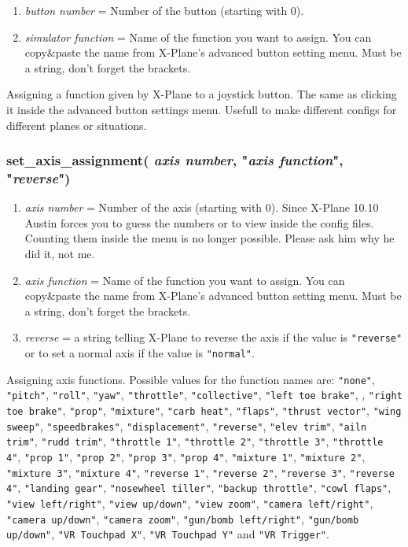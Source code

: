\documentclass[11pt,parskip=half,a4paper]{scrartcl}
\begin{document}
\begin{enumerate}
	\item \emph{button number} = Number of the button (starting with 0).
	\item \emph{simulator function} = Name of the function you want to assign. You can copy\&paste the name from X-Plane's advanced button setting menu. Must be a string, don't forget the brackets.
\end{enumerate}

Assigning a function given by X-Plane to a joystick button. The same as clicking it inside the advanced button settings menu. Usefull to make different configs for different planes or situations.

\newpage
\subsubsection{set\_axis\_assignment( \emph{axis number}, "\emph{axis function}", "\emph{reverse}")}

\begin{enumerate}
	\item \emph{axis number} = Number of the axis (starting with 0). Since X-Plane 10.10 Austin forces you to guess the numbers or to view inside the config files. Counting them inside the menu is no longer possible. Please ask him why he did it, not me.
	\item \emph{axis function} = Name of the function you want to assign. You can copy\&paste the name from X-Plane's advanced button setting menu. Must be a string, don't forget the brackets.
	\item \emph{reverse} = a string telling X-Plane to reverse the axis if the value is \verb|"reverse"| or to set a normal axis if the value is \verb|"normal"|.
\end{enumerate}

Assigning axis functions. Possible values for the function names are: \verb|"none"|, \verb|"pitch"|, \verb|"roll"|, \verb|"yaw"|, \verb|"throttle"|, \verb|"collective"|, \verb|"left toe brake"|, , \verb|"right toe brake"|, \verb|"prop"|, \verb|"mixture"|, \verb|"carb heat"|, \verb|"flaps"|, \verb|"thrust vector"|, \verb|"wing sweep"|, \verb|"speedbrakes"|, \verb|"displacement"|, \verb|"reverse"|, \verb|"elev trim"|, \verb|"ailn trim"|, \verb|"rudd trim"|, \verb|"throttle 1"|, \verb|"throttle 2"|, \verb|"throttle 3"|, \verb|"throttle 4"|, \verb|"prop 1"|, \verb|"prop 2"|, \verb|"prop 3"|, \verb|"prop 4"|, \verb|"mixture 1"|, \verb|"mixture 2"|, \verb|"mixture 3"|, \verb|"mixture 4"|, \verb|"reverse 1"|, \verb|"reverse 2"|, \verb|"reverse 3"|, \verb|"reverse 4"|, \verb|"landing gear"|, \verb|"nosewheel tiller"|, \verb|"backup throttle"|, \verb|"cowl flaps"|, \verb|"view left/right"|, \verb|"view up/down"|, \verb|"view zoom"|, \verb|"camera left/right"|, \verb|"camera up/down"|, \verb|"camera zoom"|,
\verb|"gun/bomb left/right"|, \verb|"gun/bomb up/down"|, \verb|"VR Touchpad X"|, \verb|"VR Touchpad Y"| and \verb|"VR Trigger"|.
	
\end{document}
